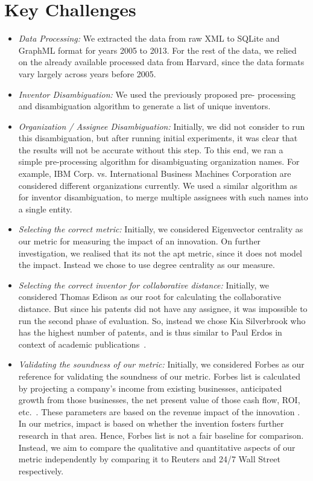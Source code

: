 \section{Key Challenges}
	\begin{itemize}
	\squish
		\item {\em Data Processing:} We extracted the data from raw XML to SQLite and
		GraphML format for years 2005 to 2013. For the rest of the data, we relied on
		the already available processed data from Harvard, since the data formats vary largely across years before 2005.
		\item {\em Inventor Disambiguation:} We used the previously proposed pre-
		processing and disambiguation algorithm to generate a list of unique
		inventors.
		\item {\em Organization / Assignee Disambiguation:} 
		Initially, we did not consider to run this disambiguation, but after running initial experiments, it was clear that the results will not be accurate without this step. 
		To this end, we ran a simple pre-processing algorithm for disambiguating
		organization names. For example, IBM Corp. vs. International Business Machines
		Corporation are considered different organizations currently. We used a
		similar algorithm as for inventor disambiguation, to merge multiple assignees
		with such names into a single entity.
		\item{\em Selecting the correct metric:} Initially, we considered Eigenvector centrality as our metric for measuring the impact of an innovation. On further investigation, we realised that its not the apt metric, since it does not model the impact. Instead we chose to use degree centrality as our measure. 
		\item{\em Selecting the correct inventor for collaborative distance:} Initially, we considered Thomas Edison as our root for calculating the collaborative distance. But since his patents did not have any assignee, it was impossible to run the second phase of evaluation. So, instead we chose Kia Silverbrook who has the highest number of patents, and is thus similar to  Paul Erdos in context of academic publications~\cite{erdos}. 
		\item{\em Validating the soundness of our metric:} Initially, we considered Forbes as our reference for validating the soundness of our metric. Forbes list is calculated by projecting a company’s income from existing businesses, anticipated growth from those businesses, the net present value of those cash flow, ROI, etc.~\cite{forbeshow}. These parameters are based on the revenue impact of the innovation . In our metrics, impact is based on whether the invention fosters further research in that area. Hence, Forbes list is not a  fair baseline for comparison. Instead, we aim to compare the qualitative and quantitative aspects of our metric independently by comparing it to Reuters and 24/7 Wall Street respectively.

\end{itemize}
